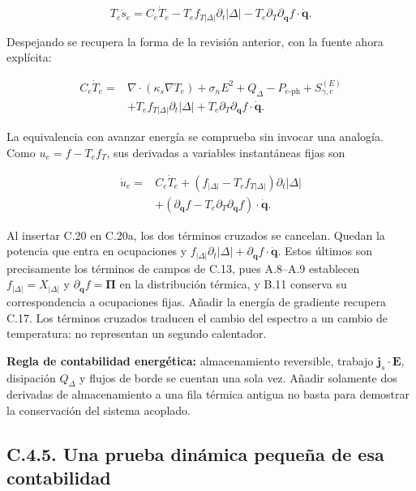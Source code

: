 \documentclass[
  spanish,
  10pt,
  a4paper,
]{article}
\begin{document}
\[
T_e\dot s_e=C_e\dot T_e
-T_ef_{T|\Delta|}\partial_t|\Delta|
-T_e\partial_T\partial_{\mathbf q}f\cdot\dot{\mathbf q}.
\tag{C.19a}
\]

Despejando se recupera la forma de la revisión anterior, con la fuente
ahora explícita:

\[
\boxed{\begin{aligned}
C_e\dot T_e={}&\nabla\cdot(\kappa_s\nabla T_e)
+\sigma_nE^2+Q_\Delta-P_{e\text{-ph}}+S_{\gamma,e}^{(E)}\\
&+T_ef_{T|\Delta|}\partial_t|\Delta|
+T_e\partial_T\partial_{\mathbf q}f\cdot\dot{\mathbf q}.
\end{aligned}}\tag{C.20}
\]

La equivalencia con avanzar energía se comprueba sin invocar una
analogía. Como \(u_e=f-T_ef_T\), sus derivadas a variables instantáneas
fijas son

\[
\begin{aligned}
\dot u_e={}&C_e\dot T_e
+(f_{|\Delta|}-T_ef_{T|\Delta|})\partial_t|\Delta|\\
&+(\partial_{\mathbf q}f-T_e\partial_T\partial_{\mathbf q}f)
\cdot\dot{\mathbf q}.
\end{aligned}\tag{C.20a}
\]

Al insertar C.20 en C.20a, los dos términos cruzados se cancelan. Quedan
la potencia que entra en ocupaciones y
\(f_{|\Delta|}\partial_t|\Delta|+\partial_{\mathbf q}f\cdot\dot{\mathbf q}\).
Estos últimos son precisamente los términos de campos de C.13, pues
A.8--A.9 establecen \(f_{|\Delta|}=X_{|\Delta|}\) y
\(\partial_{\mathbf q}f=\boldsymbol\Pi\) en la distribución térmica, y
B.11 conserva su correspondencia a ocupaciones fijas. Añadir la energía
de gradiente recupera C.17. Los términos cruzados traducen el cambio del
espectro a un cambio de temperatura: no representan un segundo
calentador.

\textbf{Regla de contabilidad energética:} almacenamiento reversible,
trabajo \(\mathbf j_s\cdot\mathbf E\), disipación \(Q_\Delta\) y flujos
de borde se cuentan una sola vez. Añadir solamente dos derivadas de
almacenamiento a una fila térmica antigua no basta para demostrar la
conservación del sistema acoplado.

\subsection{C.4.5. Una prueba dinámica pequeña de esa
contabilidad}\label{c.4.5.-una-prueba-dinuxe1mica-pequeuxf1a-de-esa-contabilidad}
\end{document}
